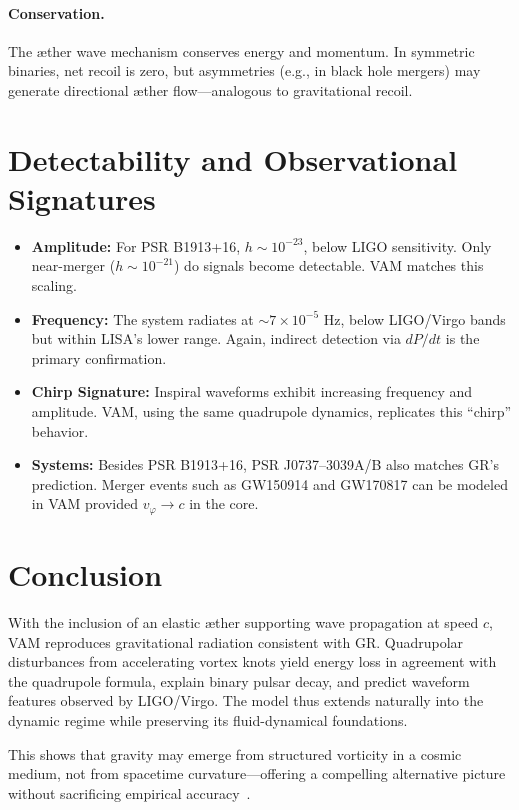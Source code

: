 \paragraph{Conservation.}
The æther wave mechanism conserves energy and momentum. In symmetric binaries, net recoil is zero, but asymmetries (e.g., in black hole mergers) may generate directional æther flow—analogous to gravitational recoil.

\section*{Detectability and Observational Signatures}

\begin{itemize}
\item \textbf{Amplitude:} For PSR B1913+16, $h \sim 10^{-23}$, below LIGO sensitivity. Only near-merger ($h \sim 10^{-21}$) do signals become detectable. VAM matches this scaling.
\item \textbf{Frequency:} The system radiates at $\sim 7 \times 10^{-5}$ Hz, below LIGO/Virgo bands but within LISA’s lower range. Again, indirect detection via $dP/dt$ is the primary confirmation.
\item \textbf{Chirp Signature:} Inspiral waveforms exhibit increasing frequency and amplitude. VAM, using the same quadrupole dynamics, replicates this “chirp” behavior.
\item \textbf{Systems:} Besides PSR B1913+16, PSR J0737–3039A/B also matches GR’s prediction. Merger events such as GW150914 and GW170817 can be modeled in VAM provided $v_\varphi \rightarrow c$ in the core.
\end{itemize}

\section*{Conclusion}

With the inclusion of an elastic æther supporting wave propagation at speed $c$, VAM reproduces gravitational radiation consistent with GR. Quadrupolar disturbances from accelerating vortex knots yield energy loss in agreement with the quadrupole formula, explain binary pulsar decay, and predict waveform features observed by LIGO/Virgo. The model thus extends naturally into the dynamic regime while preserving its fluid-dynamical foundations.

This shows that gravity may emerge from structured vorticity in a cosmic medium, not from spacetime curvature—offering a compelling alternative picture without sacrificing empirical accuracy~\cite{iskandarani2025VAM3}.
